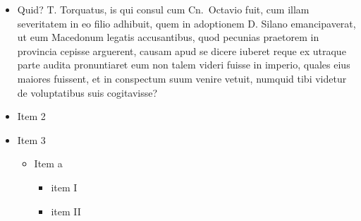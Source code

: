 \documentclass[twoside]{extreport}
\begin{document}
\begin{itemize}
\tightlist
\item
  Quid? T. Torquatus, is qui consul cum Cn.~Octavio fuit, cum illam
  severitatem in eo filio adhibuit, quem in adoptionem D. Silano
  emancipaverat, ut eum Macedonum legatis accusantibus, quod pecunias
  praetorem in provincia cepisse arguerent, causam apud se dicere
  iuberet reque ex utraque parte audita pronuntiaret eum non talem
  videri fuisse in imperio, quales eius maiores fuissent, et in
  conspectum suum venire vetuit, numquid tibi videtur de voluptatibus
  suis cogitavisse?
\item
  Item 2
\item
  Item 3

  \begin{itemize}
  \tightlist
  \item
    Item a

    \begin{itemize}
    \tightlist
    \item
      item I
    \item
      item II


\end{itemize}
\end{itemize}
\end{itemize}
\end{document}
